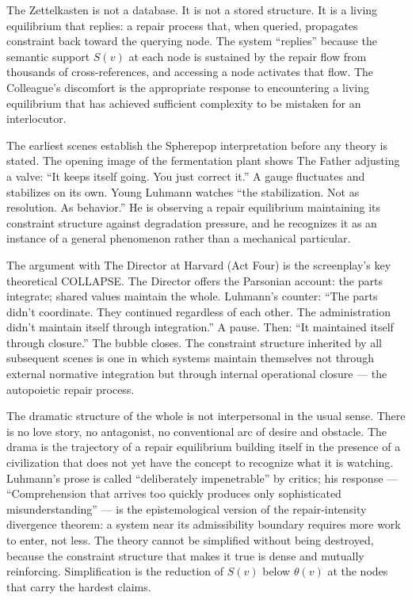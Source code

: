 \documentclass[11pt, a4paper]{article}
\theoremstyle{definition}
\theoremstyle{remark}
\begin{document}
The Zettelkasten is not a database. It is not a stored structure. It is a
living equilibrium that replies: a repair process that, when queried,
propagates constraint back toward the querying node. The system ``replies''
because the semantic support $S(v)$ at each node is sustained by the repair
flow from thousands of cross-references, and accessing a node activates that
flow. The Colleague's discomfort is the appropriate response to encountering
a living equilibrium that has achieved sufficient complexity to be mistaken
for an interlocutor.

The earliest scenes establish the Spherepop interpretation before any theory
is stated. The opening image of the fermentation plant shows The Father
adjusting a valve: ``It keeps itself going. You just correct it.'' A gauge
fluctuates and stabilizes on its own. Young Luhmann watches ``the stabilization.
Not as resolution. As behavior.'' He is observing a repair equilibrium
maintaining its constraint structure against degradation pressure, and he
recognizes it as an instance of a general phenomenon rather than a mechanical
particular.

The argument with The Director at Harvard (Act Four) is the screenplay's
key theoretical COLLAPSE. The Director offers the Parsonian account: the
parts integrate; shared values maintain the whole. Luhmann's counter:
``The parts didn't coordinate. They continued regardless of each other. The
administration didn't maintain itself through integration.'' A pause. Then:
``It maintained itself through closure.'' The bubble closes. The constraint
structure inherited by all subsequent scenes is one in which systems maintain
themselves not through external normative integration but through internal
operational closure --- the autopoietic repair process.

The dramatic structure of the whole is not interpersonal in the usual sense.
There is no love story, no antagonist, no conventional arc of desire and
obstacle. The drama is the trajectory of a repair equilibrium building itself
in the presence of a civilization that does not yet have the concept to
recognize what it is watching. Luhmann's prose is called ``deliberately
impenetrable'' by critics; his response --- ``Comprehension that arrives too
quickly produces only sophisticated misunderstanding'' --- is the epistemological
version of the repair-intensity divergence theorem: a system near its
admissibility boundary requires more work to enter, not less. The theory
cannot be simplified without being destroyed, because the constraint structure
that makes it true is dense and mutually reinforcing. Simplification is the
reduction of $S(v)$ below $\theta(v)$ at the nodes that carry the hardest
claims.
\end{document}

